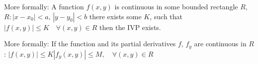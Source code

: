 \documentclass{article}
\newtheorem{definition}{Defintion}
\begin{document}
\vspace{10pt}

More formally: A function $\displaystyle{f(x, y)}$ is continuous in some bounded rectangle $R$, $\displaystyle{R : |x - x_0| < a,\, |y - y_0|< b}$ there exists some $K$, such that $\displaystyle{|f(x, y)|\le K\quad \forall (x, y) \in R}$ then the IVP exists.\\

\vspace{10pt}

More formally: If the function and its partial derivatives $f$, $f_y$ are continuous in $R$: $\displaystyle{|f(x, y)| \le K|f_y(x, y)| \le M, \quad \forall (x, y) \in R}$
\end{document}
